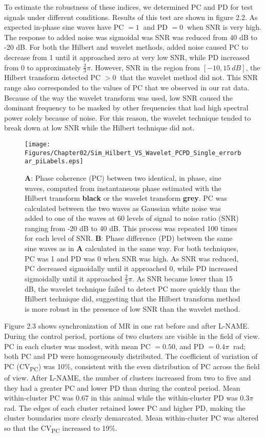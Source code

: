 To estimate the robustness of these indices, we determined PC and PD for test signals under different conditions. Results of this test are shown in figure 2.2. As expected in-phase sine waves have PC $= 1 \ $ and PD $ = 0 \ $ when SNR is very high. The response to added noise was sigmoidal was SNR was reduced from 40 dB to -20 dB. For both the Hilbert and wavelet methods, added noise caused PC to decrease from 1 until it approached zero at very low SNR, while PD increased from 0 to approximately $\frac{2}{3}\pi$. However, SNR in the region from $[-10,15 \ dB]$, the Hilbert transform detected PC $> 0 \ $ that the wavelet method did not. This SNR range also corresponded to the values of PC that we observed in our rat data. Because of the way the wavelet transform was used, low SNR caused the dominant frequency to be masked by other frequencies that had high spectral power solely because of noise. For this reason, the wavelet technique tended to break down at low SNR while the Hilbert technique did not.

\begin{figure}[H]
\begin{center}
\texttt{[image: Figures/Chapter02/Sim\_Hilbert\_VS\_Wavelet\_PCPD\_Single\_errorbar\_piLabels.eps]}
\caption[Comparison of phase coherence calculated with Hilbert and wavelet methods]{\textbf{A}: Phase coherence (PC) between two identical, in phase, sine waves, computed from instantaneous phase estimated with the Hilbert transform \textbf{black} or the wavelet transform \textbf{grey}. PC was calculated between the two waves as Gaussian white noise was added to one of the waves at 60 levels of signal to noise ratio (SNR) ranging from -20 dB to 40 dB. This process was repeated 100 times for each level of SNR. \textbf{B}: Phase difference (PD) between the same sine waves as in \textbf{A} calculated in the same way. For both techniques, PC was 1 and PD was 0 when SNR was high. As SNR was reduced, PC decreased sigmoidally until it approached 0, while PD increased sigmoidally until it approached $\frac{2}{3}\pi$. As SNR became lower than 15 dB, the wavelet technique failed to detect PC more quickly than the Hilbert technique did, suggesting that the Hilbert transform method is more robust in the presence of low SNR than the wavelet method.}
\end{center}
\end{figure}

	Figure 2.3 shows synchronization of MR in one rat before and after L-NAME. During the control period, portions of two clusters are visible in the field of view. PC in each cluster was modest, with mean PC $= 0.50$, and PD $= 0.4\pi \ $ rad; both PC and PD were homogeneously distributed. The coefficient of variation of PC (CV\textsubscript{PC}) was 10\%, consistent with the even distribution of PC across the field of view. After L-NAME, the number of clusters increased from two to five and they had a greater PC and lower PD than during the control period. Mean within-cluster PC was 0.67 in this animal while the within-cluster PD was $0.3\pi \ $ rad. The edges of each cluster retained lower PC and higher PD, making the cluster boundaries more clearly demarcated. Mean within-cluster PC was altered so that the CV\textsubscript{PC} increased to 19\%.
	
